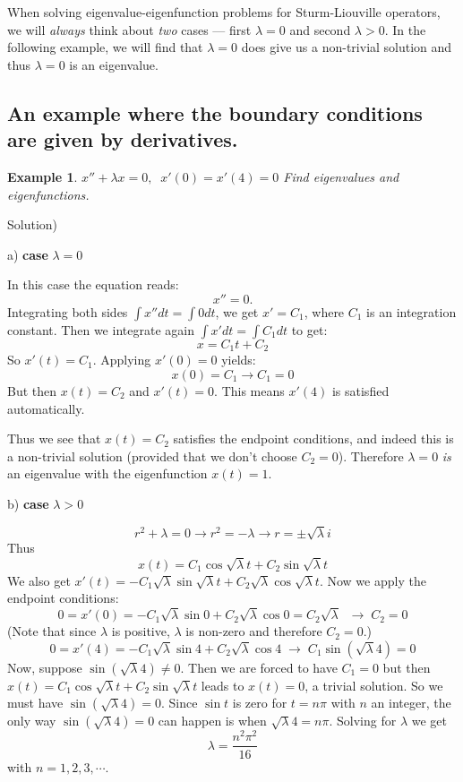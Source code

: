 \documentclass[12pt]{report}
\newtheorem{ex}{Example}[section]
\begin{document}
When solving eigenvalue-eigenfunction problems for Sturm-Liouville operators, we will \textit{always} think about \textit{two} cases --- first $\lambda=0$ and second $\lambda>0$. In the following example, we will find that $\lambda=0$ does give us a non-trivial solution and thus $\lambda=0$ is an eigenvalue.

\subsection*{An example where the boundary conditions are given by derivatives. }

\begin{ex} $x'' + \lambda x = 0, \; \; x'(0)=x'(4)=0$
	Find eigenvalues and eigenfunctions.
\end{ex}

Solution) 

a) \textbf{case } $\lambda=0$

In this case the equation reads:
$$x''=0.$$
Integrating both sides $\int x'' dt = \int 0 dt $, we get $x' = C_1$, where $C_1$ is an integration constant. Then we integrate again  $\int x' dt = \int C_1 dt$ to get:
$$x = C_1 t +C_2 $$
So $x'(t)=C_1$. Applying $x'(0)=0$ yields:
$$x(0)=  C_1 \rightarrow C_1=0$$
But then $x(t)=C_2$ and $x'(t)=0$. This means $x'(4)$ is satisfied automatically. 

Thus we see that $x(t)=C_2$ satisfies the endpoint conditions, and indeed this is a non-trivial solution (provided that we don't choose $C_2=0$). Therefore  $\lambda =0$ \textit{is} an eigenvalue with the eigenfunction $x(t)=1$. 

b) \textbf{case } $\lambda>0$

$$r^2 + \lambda = 0 \rightarrow r^2 = - \lambda \rightarrow r = \pm \sqrt{\lambda} i $$
Thus
$$x(t) = C_1 \cos \sqrt{\lambda}t + C_2 \sin \sqrt{\lambda} t $$
We also get $x'(t) = - C_1 \sqrt{\lambda} \sin \sqrt{\lambda} t + C_2 \sqrt{\lambda} \cos \sqrt{\lambda}t.$ Now we apply the endpoint conditions:
$$ 0 = x'(0) = - C_1 \sqrt{\lambda} \sin 0 + C_2 \sqrt{\lambda} \cos 0 = C_2 \sqrt{\lambda} \; \; \rightarrow \; C_2 = 0 $$
(Note that since $\lambda$ is positive, $\lambda$ is non-zero and therefore $C_2=0$.)
$$ 0 = x'(4) = - C_1 \sqrt{\lambda} \sin 4 + C_2 \sqrt{\lambda} \cos 4   \; \rightarrow \; C_1 \sin (\sqrt{\lambda} 4)=0$$
Now, suppose $\sin (\sqrt{\lambda} 4) \neq 0 $. Then we are forced to have $C_1 =0 $ but then $x(t) = C_1 \cos \sqrt{\lambda}t + C_2 \sin \sqrt{\lambda} t $ leads to $x(t) = 0 $, a trivial solution. So we must have $\sin (\sqrt{\lambda} 4) = 0 $.
Since $\sin t$ is zero for $t= n\pi$ with $n$ an integer, the only way $\sin (\sqrt{\lambda} 4) = 0 $ can happen is when $\sqrt{\lambda} 4 = n\pi $. Solving for $\lambda$ we get 
$$\lambda = \frac{n^2\pi^2}{16}$$
with $n= 1,2,3, \cdots $.
\end{document}

